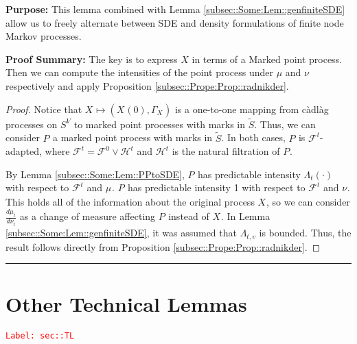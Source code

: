\documentclass[12pt]{article}
\newcommand{\mc}{\mathcal}
\newcommand{\tr}{\textcolor{red}}
\newcommand{\labe}[1]{\tr{\texttt{Label: #1}}}
\newcommand{\purpose}{\textbf{Purpose: }}
\newcommand{\pfsum}{\textbf{Proof Summary: }}
\newcommand{\ind}{\hspace{24pt}}
\newcommand{\lin}{\rule{\linewidth}{0.4 pt}}
\renewcommand{\v}{v}							%
\renewcommand{\S}{S}							%
\renewcommand{\t}{t}							%
\newcommand{\V}{V}									%
\newcommand{\rxvt}[2]{X_{#1}{(#2)}}					%
\newcommand{\rxvts}[2]{X_{#1}{#2}}					%
\newcommand{\rp}[1]{P^{#1}}							%
\newcommand{\m}[3]{\mu_{#2#1}^{#3}}						%
\newcommand{\mm}[3]{\nu_{#2#1}^{#3}}						%
\newcommand{\ratee}[1]{\Lambda_{#1}}				%
\newcommand{\F}[2]{\mc{F}_{#1}^{#2}}				%
\newcommand{\FFF}[2]{\mc{H}_{#1}^{#2}}				%
\newcommand{\alt}{\widetilde}						%
\newcommand{\pmap}[1]{\Gamma_{#1}}				%
\begin{document}
\purpose This lemma combined with Lemma \ref{subsec::Some:Lem::genfiniteSDE} allow us to freely alternate between SDE and density formulations of finite node Markov processes.

\pfsum The key is to express \(X\) in terms of a Marked point process. Then we can compute the intensities of the point process under \(\mu\) and \(\nu\) respectively and apply Proposition \ref{subsec::Prope:Prop::radnikder}.

\begin{proof}
Notice that \(\rxvts{}{} \mapsto (\rxvt{}{0},\pmap{\rxvts{}{}})\) is a one-to-one mapping from c\`adl\`ag processes on \(\S^\V\) to marked point processes with marks in \(\alt{\S}\). Thus, we can consider \(\rp{}\) a marked point process with marks in \(\alt{\S}\). In both cases, \(\rp{}\) is \(\F{}{\t}\)-adapted, where \(\F{}{\t} = \F{}{0}\vee \FFF{}{\t}\) and \(\FFF{}{\t}\) is the natural filtration of \(\rp{}\).

\ind By Lemma \ref{subsec::Some:Lem::PPtoSDE}, \(\rp{}\) has predictable intensity \(\ratee{\t}(\cdot)\) with respect to \(\F{}{\t}\) and \(\m{}{}{}\). \(\rp{}\) has predictable intensity 1 with respect to \(\F{}{\t}\) and \(\mm{}{}{}\). This holds all of the information about the original process \(\rxvts{}{}\), so we can consider \(\frac{d\m{}{\t}{}}{d\mm{}{\t}{}}\) as a change of measure affecting \(\rp{}\) instead of \(\rxvts{}{}\). In Lemma \ref{subsec::Some:Lem::genfiniteSDE}, it was assumed that \(\ratee{\t,\v}\) is bounded. Thus, the result follows directly from Proposition \ref{subsec::Prope:Prop::radnikder}. 
\end{proof}

\lin
\section{Other Technical Lemmas}
\label{sec::TL}\labe{sec::TL}
\end{document}
